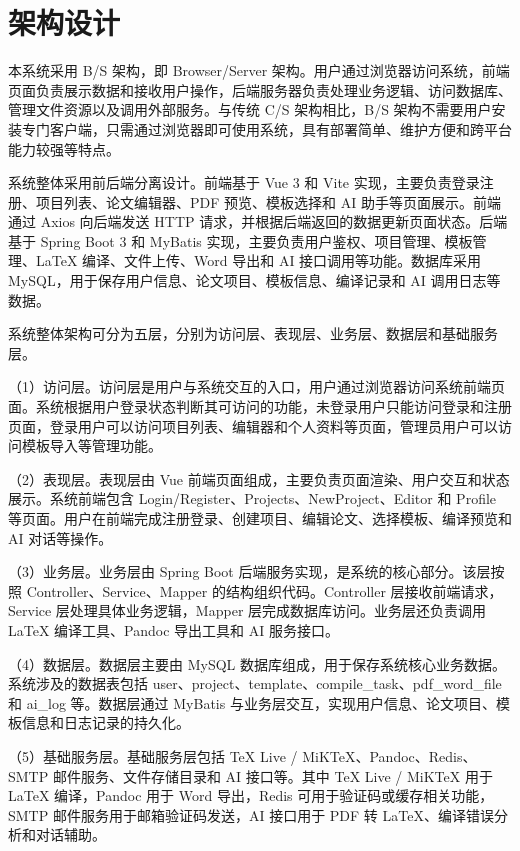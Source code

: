 \documentclass{xduugthesis}
\begin{document}
\section{架构设计}
本系统采用 B/S 架构，即 Browser/Server 架构。用户通过浏览器访问系统，前端页面负责展示数据和接收用户操作，后端服务器负责处理业务逻辑、访问数据库、管理文件资源以及调用外部服务。与传统 C/S 架构相比，B/S 架构不需要用户安装专门客户端，只需通过浏览器即可使用系统，具有部署简单、维护方便和跨平台能力较强等特点。

系统整体采用前后端分离设计。前端基于 Vue 3 和 Vite 实现，主要负责登录注册、项目列表、论文编辑器、PDF 预览、模板选择和 AI 助手等页面展示。前端通过 Axios 向后端发送 HTTP 请求，并根据后端返回的数据更新页面状态。后端基于 Spring Boot 3 和 MyBatis 实现，主要负责用户鉴权、项目管理、模板管理、LaTeX 编译、文件上传、Word 导出和 AI 接口调用等功能\cite{yang2023frontendbackend}。数据库采用 MySQL，用于保存用户信息、论文项目、模板信息、编译记录和 AI 调用日志等数据。

系统整体架构可分为五层，分别为访问层、表现层、业务层、数据层和基础服务层。

（1）访问层。访问层是用户与系统交互的入口，用户通过浏览器访问系统前端页面。系统根据用户登录状态判断其可访问的功能，未登录用户只能访问登录和注册页面，登录用户可以访问项目列表、编辑器和个人资料等页面，管理员用户可以访问模板导入等管理功能。

（2）表现层。表现层由 Vue 前端页面组成，主要负责页面渲染、用户交互和状态展示。系统前端包含 Login/Register、Projects、NewProject、Editor 和 Profile 等页面。用户在前端完成注册登录、创建项目、编辑论文、选择模板、编译预览和 AI 对话等操作。

（3）业务层。业务层由 Spring Boot 后端服务实现，是系统的核心部分。该层按照 Controller、Service、Mapper 的结构组织代码。Controller 层接收前端请求，Service 层处理具体业务逻辑，Mapper 层完成数据库访问。业务层还负责调用 LaTeX 编译工具、Pandoc 导出工具和 AI 服务接口。

（4）数据层。数据层主要由 MySQL 数据库组成，用于保存系统核心业务数据。系统涉及的数据表包括 user、project、template、compile\_task、pdf\_word\_file 和 ai\_log 等。数据层通过 MyBatis 与业务层交互，实现用户信息、论文项目、模板信息和日志记录的持久化。

（5）基础服务层。基础服务层包括 TeX Live / MiKTeX、Pandoc、Redis、SMTP 邮件服务、文件存储目录和 AI 接口等。其中 TeX Live / MiKTeX 用于 LaTeX 编译，Pandoc 用于 Word 导出，Redis 可用于验证码或缓存相关功能，SMTP 邮件服务用于邮箱验证码发送，AI 接口用于 PDF 转 LaTeX、编译错误分析和对话辅助。
\end{document}
